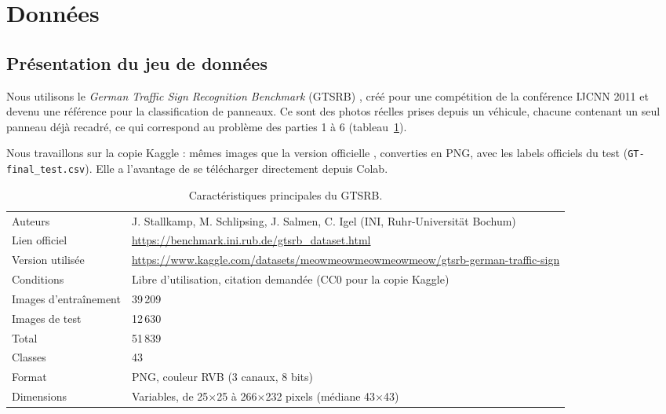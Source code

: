 \section{Données}
\label{sec:donnees}

\subsection{Présentation du jeu de données}

Nous utilisons le \emph{German Traffic Sign Recognition Benchmark} (GTSRB) \cite{stallkamp2011,stallkamp2012}, créé pour une compétition de la conférence IJCNN 2011 et devenu une référence pour la classification de panneaux. Ce sont des photos réelles prises depuis un véhicule, chacune contenant un seul panneau déjà recadré, ce qui correspond au problème des parties 1 à 6 (tableau~\ref{tab:fiche}).

Nous travaillons sur la copie Kaggle \cite{gtsrb_kaggle} : mêmes images que la version officielle \cite{gtsrb_site}, converties en PNG, avec les labels officiels du test (\texttt{GT-final\_test.csv}). Elle a l'avantage de se télécharger directement depuis Colab.

\begin{table}[ht]
  \centering
  \small
  \begin{tabularx}{0.9\linewidth}{@{}lX@{}}
    \toprule
    Auteurs & J. Stallkamp, M. Schlipsing, J. Salmen, C. Igel (INI, Ruhr-Universität Bochum) \\
    Lien officiel & \url{https://benchmark.ini.rub.de/gtsrb_dataset.html} \\
    Version utilisée & \url{https://www.kaggle.com/datasets/meowmeowmeowmeowmeow/gtsrb-german-traffic-sign} \\
    Conditions & Libre d'utilisation, citation demandée (CC0 pour la copie Kaggle) \\
    \midrule
    Images d'entraînement & 39\,209 \\
    Images de test & 12\,630 \\
    Total & 51\,839 \\
    Classes & 43 \\
    Format & PNG, couleur RVB (3 canaux, 8 bits) \\
    Dimensions & Variables, de 25$\times$25 à 266$\times$232 pixels (médiane 43$\times$43) \\
    \bottomrule
  \end{tabularx}
  \caption{Caractéristiques principales du GTSRB.}
  \label{tab:fiche}
\end{table}

